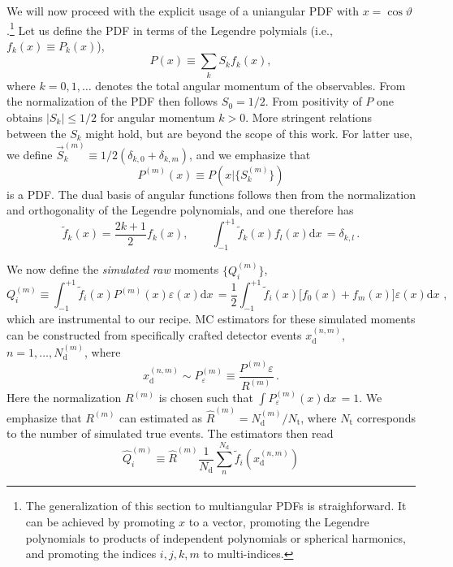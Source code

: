 \documentclass[aps,prd,reprint,nofootinbib,preprintnumbers]{revtex4}
\newcommand{\est}[1]{\widehat{#1}}
\newcommand{\rmdx}[1]{\mbox{d} #1 \,} %
\renewcommand{\theta}{\vartheta}
\let\eps\varepsilon
\begin{document}
We will now proceed with the explicit usage of a uniangular PDF with $x = \cos\theta$.\footnote{%
    The generalization of this section to multiangular PDFs is straighforward. It can be achieved
    by promoting $x$ to a vector, promoting the Legendre polynomials to products of independent polynomials
    or spherical harmonics, and promoting the indices $i,j,k,m$ to multi-indices.
}
Let us define the PDF in terms of the Legendre polymials (i.e., $f_k(x) \equiv P_k(x)$),
\begin{equation}
    P(x) \equiv \sum_k S_k f_k(x),
\end{equation}
where $k = 0, 1, \dots$ denotes the total angular momentum of the observables.
From the normalization of the PDF then follows $S_0 = 1/2$. From positivity of $P$ one
obtains $|S_k| \leq 1/2$ for angular momentum $k > 0$. More stringent relations between the
$S_k$ might hold, but are beyond the scope of this work. For latter use, we define
$\vec{S}^{(m)}_k \equiv 1/2 (\delta_{k,0} + \delta_{k,m})$, and we emphasize that
\begin{equation}
    P^{(m)}(x) \equiv P(x | \lbrace S^{(m)}_k \rbrace)
\end{equation}
is a PDF. The dual basis of angular functions follows then from the normalization
and orthogonality of the Legendre polynomials, and one therefore has
\begin{equation}
    \tilde{f}_k(x) = \frac{2 k + 1}{2} f_k(x),\qquad \int_{-1}^{+1} \tilde{f}_k(x) f_l(x) \rmdx{x} = \delta_{k,l}\,.
\end{equation}


We now define the \emph{simulated raw} moments $\lbrace Q_{i}^{(m)}\rbrace$,
\begin{equation}
    Q_i^{(m)} \equiv \int_{-1}^{+1} \tilde{f}_i(x) P^{(m)}(x) \eps(x) \rmdx{x} = \frac{1}{2} \int_{-1}^{+1} \tilde{f}_i(x) \big[f_0(x) + f_m(x)\big] \eps(x) \rmdx{x}\,,
\end{equation}
which are instrumental to our recipe. MC estimators for these simulated moments can be constructed from specifically crafted detector events $x_\text{d}^{(n,m)}$, $n = 1, \dots, N_\text{d}^{(m)}$, where
\begin{equation}
    x_\text{d}^{(n,m)} \sim P_\eps^{(m)} \equiv \frac{P^{(m)} \eps}{R^{(m)}}\,.
\end{equation}
Here the normalization $R^{(m)}$ is chosen such that $\int P_\eps^{(m)}(x) \rmdx{x} = 1$.
We emphasize that $R^{(m)}$ can estimated as $\est{R}^{(m)} = N_\text{d}^{(m)} / N_\text{t}$, where $N_\text{t}$ corresponds to the number of simulated true events.
The estimators then read
\begin{equation}
    \est{Q}_i^{(m)} \equiv \est{R}^{(m)} \frac{1}{N_\text{d}} \sum_n^{N_\text{d}} \tilde{f}_i(x_\text{d}^{(n,m)})
\end{equation}
\end{document}
